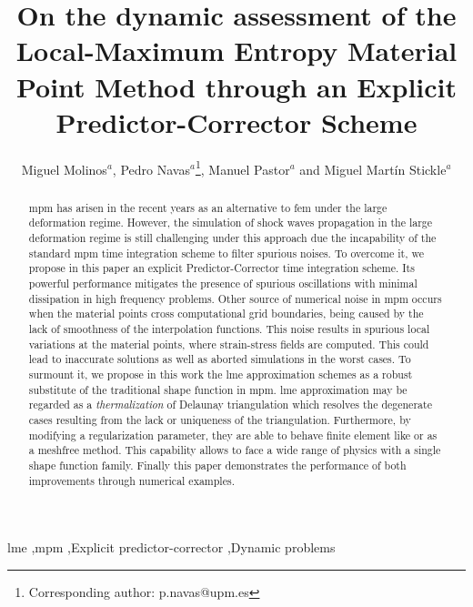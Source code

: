 \documentclass[preprint,12pt,a4paper]{elsarticle}
\begin{document}
 

\begin{frontmatter}

\title{On the dynamic assessment of the Local-Maximum Entropy Material Point Method through an Explicit Predictor-Corrector Scheme}

\author{
Miguel Molinos$^a$,
Pedro Navas$^a$\footnote{Corresponding author: p.navas@upm.es},
Manuel Pastor$^a$
and Miguel Mart\'in Stickle$^a$ 
}
\address{
  $^a$ ETSI Caminos, Canales y Puertos, Universidad Polit\'ectnica de Madrid.\\ c. Prof. Aranguren 3, 28040 Madrid, Spain
}

\begin{abstract}
  \acrfull{mpm} has arisen in the recent years as an
  alternative to \acrfull{fem} under the large
  deformation regime. However, the simulation of shock waves
  propagation in the large deformation regime is still challenging
  under this approach due the incapability of the standard \acrshort{mpm} time
  integration scheme to filter spurious noises. To overcome it, we propose in this paper an explicit Predictor-Corrector time
    integration scheme. Its powerful performance mitigates the
  presence of spurious oscillations with minimal dissipation in high
  frequency problems. Other source of numerical noise in
  \acrshort{mpm} occurs when the material points cross computational grid boundaries, being caused by
  the lack of smoothness of the interpolation functions. This noise
  results in spurious local variations at the material points, where
  strain-stress fields are computed. This could lead to inaccurate
  solutions as well as aborted simulations in the worst cases. To
  surmount it, we propose in this work the \acrfull{lme} approximation
  schemes as a robust substitute of the traditional shape function in
  \acrshort{mpm}. \acrshort{lme} approximation may be regarded as a
  \textit{thermalization} of Delaunay triangulation which resolves the
  degenerate cases resulting from the lack or uniqueness of the
  triangulation. Furthermore, by modifying a regularization parameter,
  they are able to behave finite element like or as a meshfree
  method. This capability allows to face a wide range of physics
  with a single shape function family. Finally this paper demonstrates
  the performance of both improvements through numerical examples.    
\end{abstract}

\begin{keyword}
  \acrshort{lme} \sep \acrshort{mpm} \sep Explicit predictor-corrector \sep Dynamic problems
\end{keyword}


\end{frontmatter}
\end{document}

